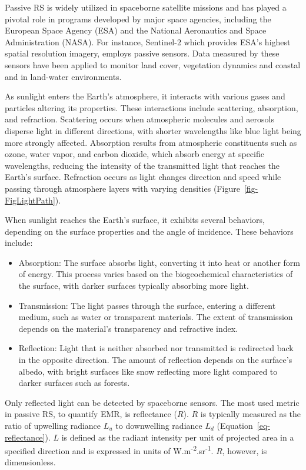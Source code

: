 \documentclass[
  letterpaper,
  11pt,
  english,
  singlespacing,
  headsepline]{MastersDoctoralThesis}
\begin{document}
\begin{spacing}{1.5}
Passive RS is widely utilized in spaceborne satellite missions and has
played a pivotal role in programs developed by major space agencies,
including the European Space Agency (ESA) and the National Aeronautics
and Space Administration (NASA). For instance, Sentinel-2 which provides
ESA's highest spatial resolution imagery, employs passive sensors. Data
measured by these sensors have been applied to monitor land cover,
vegetation dynamics and coastal and in land-water environments.

As sunlight enters the Earth's atmosphere, it interacts with various
gases and particles altering its properties. These interactions include
scattering, absorption, and refraction. Scattering occurs when
atmospheric molecules and aerosols disperse light in different
directions, with shorter wavelengths like blue light being more strongly
affected. Absorption results from atmospheric constituents such as
ozone, water vapor, and carbon dioxide, which absorb energy at specific
wavelengths, reducing the intensity of the transmitted light that
reaches the Earth's surface. Refraction occurs as light changes
direction and speed while passing through atmosphere layers with varying
densities (Figure~\ref{fig-FigLightPath}).

When sunlight reaches the Earth's surface, it exhibits several
behaviors, depending on the surface properties and the angle of
incidence. These behaviors include:

\begin{itemize}
\item
  Absorption: The surface absorbs light, converting it into heat or
  another form of energy. This process varies based on the
  biogeochemical characteristics of the surface, with darker surfaces
  typically absorbing more light.
\item
  Transmission: The light passes through the surface, entering a
  different medium, such as water or transparent materials. The extent
  of transmission depends on the material's transparency and refractive
  index.
\item
  Reflection: Light that is neither absorbed nor transmitted is
  redirected back in the opposite direction. The amount of reflection
  depends on the surface's albedo, with bright surfaces like snow
  reflecting more light compared to darker surfaces such as forests.
\end{itemize}

Only reflected light can be detected by spaceborne sensors. The most
used metric in passive RS, to quantify EMR, is reflectance (\(R\)).
\(R\) is typically measured as the ratio of upwelling radiance \(L_u\)
to downwelling radiance \(L_d\) (Equation~\ref{eq-reflectance}). \(L\)
is defined as the radiant intensity per unit of projected area in a
specified direction and is expressed in units of
W.m\textsuperscript{-2}.sr\textsuperscript{-1}. \(R\), however, is
dimensionless.


\end{spacing}
\end{document}
